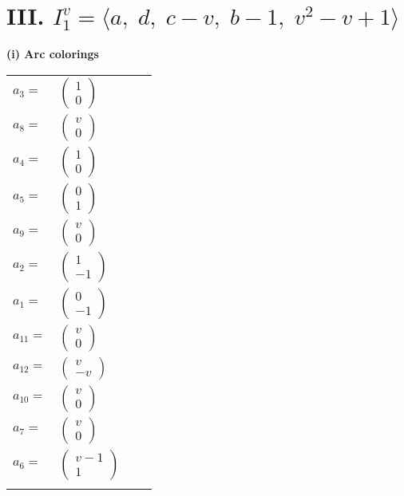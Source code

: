 \documentclass[1p]{elsarticle_modified}
\theoremstyle{definition}
\begin{document}
\centering \section*{III. $I^v_{1}= \langle a,\;d,\;c- v,\;b-1,\;v^2- v+1 \rangle$}
\flushleft \textbf{(i) Arc colorings}\\
\begin{tabular}{m{7pt} m{180pt} m{7pt} m{180pt} }
\flushright $a_{3}=$&$\begin{pmatrix}1\\0\end{pmatrix}$ \\
\flushright $a_{8}=$&$\begin{pmatrix}v\\0\end{pmatrix}$ \\
\flushright $a_{4}=$&$\begin{pmatrix}1\\0\end{pmatrix}$ \\
\flushright $a_{5}=$&$\begin{pmatrix}0\\1\end{pmatrix}$ \\
\flushright $a_{9}=$&$\begin{pmatrix}v\\0\end{pmatrix}$ \\
\flushright $a_{2}=$&$\begin{pmatrix}1\\-1\end{pmatrix}$ \\
\flushright $a_{1}=$&$\begin{pmatrix}0\\-1\end{pmatrix}$ \\
\flushright $a_{11}=$&$\begin{pmatrix}v\\0\end{pmatrix}$ \\
\flushright $a_{12}=$&$\begin{pmatrix}v\\- v\end{pmatrix}$ \\
\flushright $a_{10}=$&$\begin{pmatrix}v\\0\end{pmatrix}$ \\
\flushright $a_{7}=$&$\begin{pmatrix}v\\0\end{pmatrix}$ \\
\flushright $a_{6}=$&$\begin{pmatrix}v-1\\1\end{pmatrix}$\\&\end{tabular}
\end{document}
